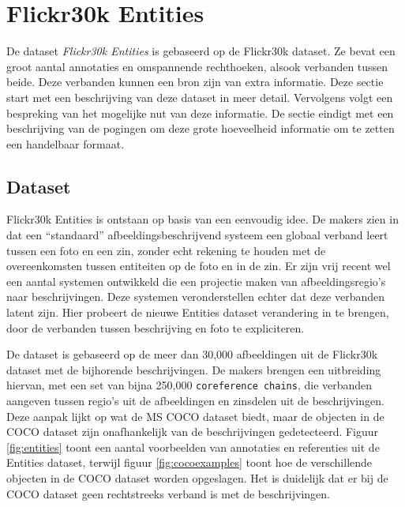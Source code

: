 \section{Flickr30k Entities}
De dataset \emph{Flickr30k Entities}\cite{Plummer2015} is gebaseerd op de Flickr30k dataset. Ze bevat een groot aantal annotaties en omspannende rechthoeken, alsook verbanden tussen beide. Deze verbanden kunnen een bron zijn van extra informatie. Deze sectie start met een beschrijving van deze dataset in meer detail. Vervolgens volgt een bespreking van het mogelijke nut van deze informatie. De sectie eindigt met een beschrijving van de pogingen om deze grote hoeveelheid informatie om te zetten een handelbaar formaat. 

\subsection{Dataset}
\label{sub:Dataset}
Flickr30k Entities is ontstaan op basis van een eenvoudig idee. De makers zien in dat een ``standaard'' afbeeldingsbeschrijvend systeem een globaal verband leert tussen een foto en een zin, zonder echt rekening te houden met de overeenkomsten tussen entiteiten op de foto en in de zin. Er zijn vrij recent wel een aantal systemen ontwikkeld die een projectie maken van afbeeldingsregio's naar beschrijvingen. Deze systemen veronderstellen echter dat deze verbanden latent zijn. Hier probeert de nieuwe Entities dataset verandering in te brengen, door de verbanden tussen beschrijving en foto te expliciteren.

De dataset is gebaseerd op de meer dan 30,000 afbeeldingen uit de Flickr30k dataset\cite{Young2014} met de bijhorende beschrijvingen. De makers brengen een uitbreiding hiervan, met een set van bijna 250,000 \texttt{coreference chains}, die verbanden aangeven tussen regio's uit de afbeeldingen en zinsdelen uit de beschrijvingen. Deze aanpak lijkt op wat de MS COCO\cite{Lin2014} dataset biedt, maar de objecten in de COCO dataset zijn onafhankelijk van de beschrijvingen gedetecteerd. Figuur \ref{fig:entities} toont een aantal voorbeelden van annotaties en referenties uit de Entities dataset, terwijl figuur \ref{fig:cocoexamples} toont hoe de verschillende objecten in de COCO dataset worden opgeslagen. Het is duidelijk dat er bij de COCO dataset geen rechtstreeks verband is met de beschrijvingen.

